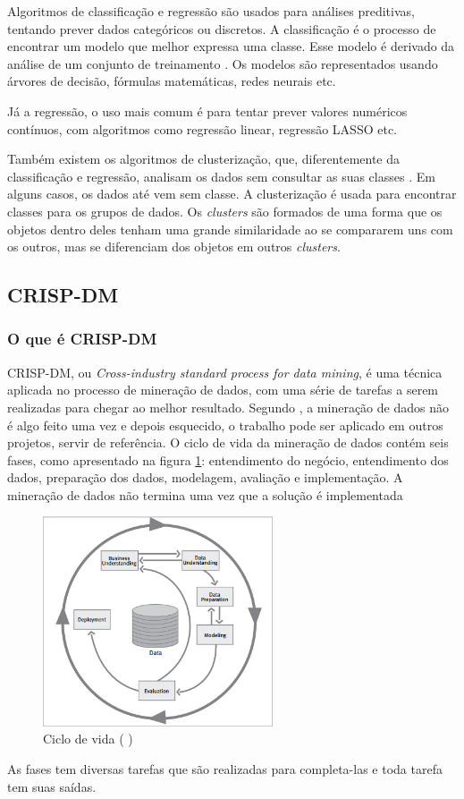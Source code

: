 Algoritmos de classificação e regressão são usados para análises preditivas, tentando prever dados categóricos ou discretos. A classificação é o processo de encontrar um modelo que melhor expressa uma classe. Esse modelo é derivado da análise de um conjunto de treinamento \citep{jmj}. Os modelos são representados usando árvores de decisão, fórmulas matemáticas, redes neurais etc.

Já a regressão, o uso mais comum é para tentar prever valores numéricos contínuos, com algoritmos como regressão linear, regressão LASSO etc.

Também existem os algoritmos de clusterização, que, diferentemente da classificação e regressão, analisam os dados sem consultar as suas classes \citep{jmj}. Em alguns casos, os dados até vem sem classe. A clusterização é usada para encontrar classes para os grupos de dados. Os \textit{clusters} são formados de uma forma que os objetos dentro deles tenham uma grande similaridade ao se compararem uns com os outros, mas se diferenciam dos objetos em outros \textit{clusters}.

\subsection{CRISP-DM}
\subsubsection{O que é CRISP-DM}
CRISP-DM, ou\textit{ Cross-industry standard process for data mining}, é uma técnica aplicada no processo de mineração de dados, com uma série de tarefas a serem realizadas para chegar ao melhor resultado.
Segundo , a mineração de dados não é algo feito uma vez e depois esquecido, o trabalho pode ser aplicado em outros projetos, servir de referência.
O ciclo de vida da mineração de dados contém seis fases, como apresentado na figura \ref{crispcycle}: entendimento do negócio, entendimento dos dados, preparação dos dados, modelagem, avaliação e implementação. 
A mineração de dados não termina uma vez que a solução é implementada \citep{crispmanual}
\begin{figure}[H]
\centering
\includegraphics[height=6.2cm]{imagens/lifecycle.png}
\caption{Ciclo de vida (\citeauthor{crispmanual} \citeyear{crispmanual})}
\label{crispcycle}
\end{figure}
As fases tem diversas tarefas que são realizadas para completa-las e toda tarefa tem suas saídas.
